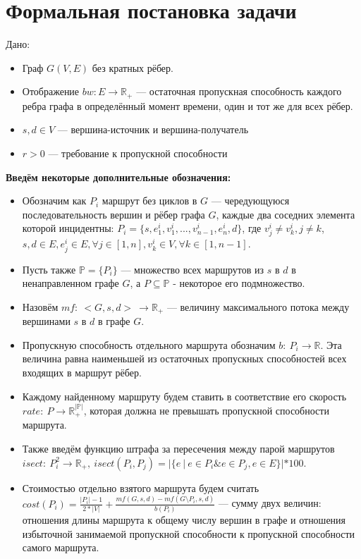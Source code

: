 \documentclass[a4paper]{article}
\begin{document}
\section{Формальная постановка задачи}
Дано:
\begin{itemize}
\item Граф $G(V, E)$ без кратных рёбер.
\item Отображение $bw: E \to \mathbb{R}_+$ --- остаточная пропускная способность каждого ребра графа в определённый момент времени, один и тот же для всех рёбер.
\item $s, d \in V$ --- вершина-источник и вершина-получатель
\item $r>0$ --- требование к пропускной способности 
\end{itemize}
\textbf{Введём некоторые дополнительные обозначения:}
\begin{itemize}

\item Обозначим как $P_i$ маршрут без циклов в $G$ --- чередующуюся последовательность вершин и рёбер графа $G$, каждые два соседних элемента которой инцидентны: $P_i = \{s, e^i_1, v^i_1, ..., v^i_{n-1}, e^i_n, d\}$, где $v^i_j \ne v^i_k, j \ne k$, $s, d \in E, e^i_j \in E, \forall j \in [1, n], v^i_k \in V, \forall k \in [1, n-1] $.

\item Пусть также $\mathbb{P} = \{P_i\}$ --- множество всех маршрутов из $s$ в $d$ в ненаправленном графе $G$, а $P \subseteq \mathbb{P}$ - некоторое его подмножество.

\item Назовём $mf:\ <G, s, d>\ \to \mathbb{R_+}$ --- величину максимального потока между вершинами $s$ в $d$ в графе $G$.

\item Пропускную способность отдельного маршрута обозначим $b:\ P_i \to \mathbb{R}$. Эта величина равна наименьшей из  остаточных пропускных способностей всех входящих в маршрут рёбер.

\item Каждому найденному маршруту будем ставить в соответствие его скорость $rate:\  P \to \mathbb{R_+^{|P|}}$, которая должна не превышать пропускной способности маршрута. 

\item Также введём функцию штрафа за пересечения между парой маршрутов $isect:\ P_i^2 \to \mathbb{R}_+,\ isect(P_i, P_j) = |\{e\ |\ e \in P_i \& e \in P_j, e \in E\}|*100$.

\item Стоимостью отдельно взятого маршрута будем считать $cost(P_i) = \frac{|P_i| - 1}{2*|V|} + \frac{mf(G, s, d) - mf(G \setminus P_i, s, d)}{b(P_i)}$ --- сумму двух величин: отношения длины маршрута к общему числу вершин в графе и отношения избыточной занимаемой пропускной способности к пропускной способности самого маршрута.


\end{itemize}
\end{document}
